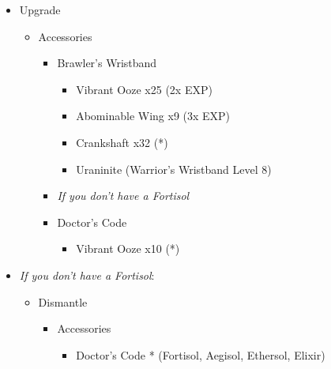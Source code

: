 \documentclass{report}
\begin{document}
\begin{upgrade}
\begin{itemize}
    \item Upgrade
    \begin{itemize}
        \item Accessories
        \begin{itemize}
            \item Brawler's Wristband
            \begin{itemize}
                \item Vibrant Ooze x25 (2x EXP)
                \item Abominable Wing x9 (3x EXP)
                \item Crankshaft x32 (*)
                \item Uraninite (Warrior's Wristband Level 8)
            \end{itemize}
            \item \textit{If you don't have a Fortisol}
            \item Doctor's Code
            \begin{itemize}
                \item Vibrant Ooze x10 (*)
            \end{itemize}
        \end{itemize}
    \end{itemize}
    \item \textit{If you don't have a Fortisol}:
    \begin{itemize}
        \item Dismantle
        \begin{itemize}
            \item Accessories
            \begin{itemize}
                \item Doctor's Code * (Fortisol, Aegisol, Ethersol, Elixir)
            \end{itemize}
        \end{itemize}
    \end{itemize}
\end{itemize}
\end{upgrade}
\end{document}
